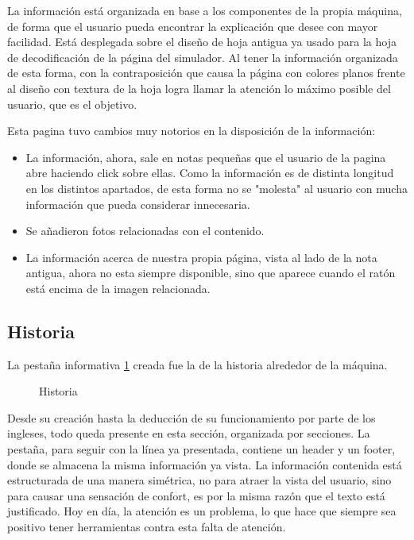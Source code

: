 La información está organizada en base a los componentes de la propia máquina, de forma que el usuario pueda encontrar la explicación que desee con mayor facilidad. Está desplegada sobre el diseño de hoja antigua ya usado para la hoja de decodificación de la página del simulador. Al tener la información organizada de esta forma, con la contraposición que causa la página con colores planos frente al diseño con textura de la hoja logra llamar la atención lo máximo posible del usuario, que es el objetivo. 

Esta pagina tuvo cambios muy notorios en la disposición de la información:
\begin{itemize}
	\item La información, ahora, sale en notas pequeñas que el usuario de la pagina abre haciendo click sobre ellas. Como la información es de distinta longitud en los distintos apartados, de esta forma no se "molesta" al usuario con mucha información que pueda considerar innecesaria.
	\item Se añadieron fotos relacionadas con el contenido.
	\item La información acerca de nuestra propia página, vista al lado de la nota antigua, ahora no esta siempre disponible, sino que aparece cuando el ratón está encima de la imagen relacionada.
\end{itemize}

\subsection{Historia}

La pestaña informativa \ref{historia} creada fue la de la historia alrededor de la máquina.
\begin{figure}[htbp]
	\centerline{}
	\caption{Historia}
	\label{historia}
\end{figure}

Desde su creación hasta la deducción de su funcionamiento por parte de los ingleses, todo queda presente en esta sección, organizada por secciones.
La pestaña, para seguir con la línea ya presentada, contiene un header y un footer, donde se almacena la misma información ya vista. 
La información contenida está estructurada de una manera simétrica, no para atraer la vista del usuario, sino para causar una sensación de confort, es por la misma razón que el texto está justificado. Hoy en día, la atención es un problema, lo que hace que siempre sea positivo tener herramientas contra esta falta de atención.

